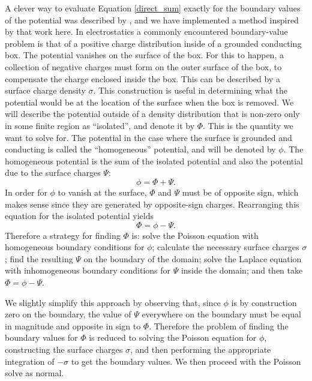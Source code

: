 \documentclass[12pt,preprint]{aastex}
\begin{document}
A clever way to evaluate Equation \ref{direct_sum} exactly for the boundary values of the potential was described by \cite{james77}, and we have implemented a method inspired by that work here. In electrostatics a commonly encountered boundary-value problem is that of a positive charge distribution inside of a grounded conducting box. The potential vanishes on the surface of the box. For this to happen, a collection of negative charges must form on the outer surface of the box, to compensate the charge enclosed inside the box. This can be described by a surface charge density $\sigma$. This construction is useful in determining what the potential would be at the location of the surface when the box is removed. We will describe the potential outside of a density distribution that is non-zero only in some finite region as ``isolated'', and denote it by $\Phi$. This is the quantity we want to solve for. The potential in the case where the surface is grounded and conducting is called the ``homogeneous'' potential, and will be denoted by $\phi$. The homogeneous potential is the sum of the isolated potential and also the potential due to the surface charges $\Psi$:
\begin{equation*}
  \phi = \Phi + \Psi.
\end{equation*}
In order for $\phi$ to vanish at the surface, $\Phi$ and $\Psi$ must be of opposite sign, which makes sense since they are generated by opposite-sign charges. Rearranging this equation for the isolated potential yields
\begin{equation}
  \Phi = \phi - \Psi.
\end{equation}
Therefore a strategy for finding $\Phi$ is: solve the Poisson equation with homogeneous boundary conditions for $\phi$; calculate the necessary surface charges $\sigma$; find the resulting $\Psi$ on the boundary of the domain; solve the Laplace equation with inhomogeneous boundary conditions for $\Psi$ inside the domain; and then take $\Phi = \phi - \Psi$. 

We slightly simplify this approach by observing that, since $\phi$ is by construction zero on the boundary, the value of $\Psi$ everywhere on the boundary must be equal in magnitude and opposite in sign to $\Phi$. Therefore the problem of finding the boundary values for $\Phi$ is reduced to solving the Poisson equation for $\phi$, constructing the surface charges $\sigma$, and then performing the appropriate integration of $-\sigma$ to get the boundary values. We then proceed with the Poisson solve as normal.
\end{document}
